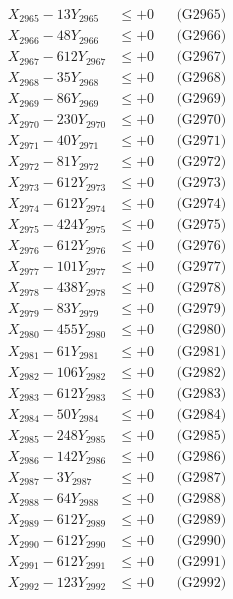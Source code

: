 \documentclass[a4paper,10pt]{article}
\begin{document}
{\begin{align}
X_{2965} - 13Y_{2965} &\leq +0 && \text{(G2965)} \\
X_{2966} - 48Y_{2966} &\leq +0 && \text{(G2966)} \\
X_{2967} - 612Y_{2967} &\leq +0 && \text{(G2967)} \\
X_{2968} - 35Y_{2968} &\leq +0 && \text{(G2968)} \\
X_{2969} - 86Y_{2969} &\leq +0 && \text{(G2969)} \\
X_{2970} - 230Y_{2970} &\leq +0 && \text{(G2970)} \\
\allowbreak
X_{2971} - 40Y_{2971} &\leq +0 && \text{(G2971)} \\
X_{2972} - 81Y_{2972} &\leq +0 && \text{(G2972)} \\
X_{2973} - 612Y_{2973} &\leq +0 && \text{(G2973)} \\
X_{2974} - 612Y_{2974} &\leq +0 && \text{(G2974)} \\
X_{2975} - 424Y_{2975} &\leq +0 && \text{(G2975)} \\
X_{2976} - 612Y_{2976} &\leq +0 && \text{(G2976)} \\
X_{2977} - 101Y_{2977} &\leq +0 && \text{(G2977)} \\
X_{2978} - 438Y_{2978} &\leq +0 && \text{(G2978)} \\
X_{2979} - 83Y_{2979} &\leq +0 && \text{(G2979)} \\
X_{2980} - 455Y_{2980} &\leq +0 && \text{(G2980)} \\
\allowbreak
X_{2981} - 61Y_{2981} &\leq +0 && \text{(G2981)} \\
X_{2982} - 106Y_{2982} &\leq +0 && \text{(G2982)} \\
X_{2983} - 612Y_{2983} &\leq +0 && \text{(G2983)} \\
X_{2984} - 50Y_{2984} &\leq +0 && \text{(G2984)} \\
X_{2985} - 248Y_{2985} &\leq +0 && \text{(G2985)} \\
X_{2986} - 142Y_{2986} &\leq +0 && \text{(G2986)} \\
X_{2987} - 3Y_{2987} &\leq +0 && \text{(G2987)} \\
X_{2988} - 64Y_{2988} &\leq +0 && \text{(G2988)} \\
X_{2989} - 612Y_{2989} &\leq +0 && \text{(G2989)} \\
X_{2990} - 612Y_{2990} &\leq +0 && \text{(G2990)} \\
\allowbreak
X_{2991} - 612Y_{2991} &\leq +0 && \text{(G2991)} \\
X_{2992} - 123Y_{2992} &\leq +0 && \text{(G2992)} \\

\end{align}}
\end{document}
